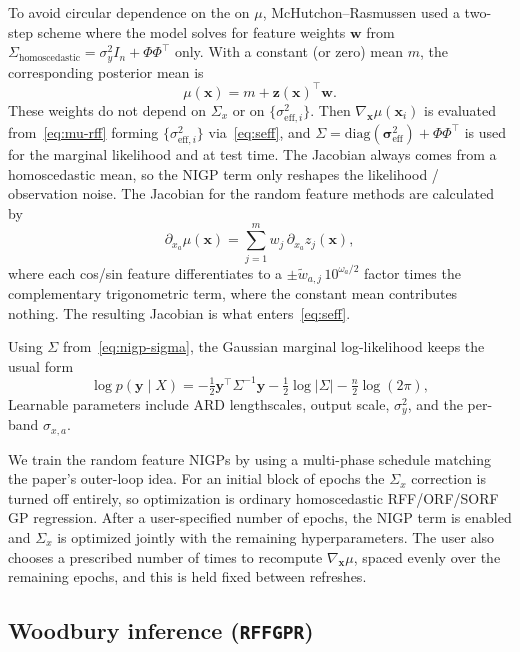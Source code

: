 \documentclass[11pt]{article}
\newcommand{\Sig}{\Sigma}
\newcommand{\Ph}{\Phi}
\newcommand{\gradmu}{\nabla_{\mathbf{x}}\mu}
\newcommand{\Sigx}{\Sigma_{x}}
\newcommand{\noisey}{\sigma_y^{2}}
\newcommand{\di}{\sigma_{\mathrm{eff},i}^{2}}
\newcommand{\seffvec}{\boldsymbol{\sigma}_{\mathrm{eff}}^{2}}
\begin{document}
To avoid circular dependence on the on $\mu$, McHutchon--Rasmussen used a two-step scheme where the model solves for feature weights $\mathbf{w}$ from $\Sig_{\mathrm{homoscedastic}}=\noisey I_n+\Ph\Ph^{\top}$ only. With a constant (or zero) mean $m$, the corresponding posterior mean is
\begin{equation}
    \label{eq:mu-rff}
      \mu(\mathbf{x})
      =
      m
      +
      \mathbf{z}(\mathbf{x})^{\top}\mathbf{w}.
    \end{equation}
These weights do not depend on $\Sigx$ or on $\{\di\}$. Then $\gradmu(\mathbf{x}_i)$ is evaluated from~\eqref{eq:mu-rff} forming $\{\di\}$ via~\eqref{eq:seff}, and $\Sig=\mathrm{diag}(\seffvec)+\Ph\Ph^{\top}$ is used for the marginal likelihood and at test time. The Jacobian
always comes from a homoscedastic mean, so the NIGP term only reshapes the likelihood /
observation noise. The Jacobian for the random feature methods are calculated by 
\begin{equation}
\label{eq:grad-mu-rff}
  \partial_{x_a}\mu(\mathbf{x})
  =
  \sum_{j=1}^{m}
  w_j\,
  \partial_{x_a} z_j(\mathbf{x}),
\end{equation}
where each cos/sin feature differentiates to a $\pm\tilde{w}_{a,j}\,10^{\omega_a/2}$
factor times the complementary trigonometric term, where the constant mean contributes
nothing. The resulting Jacobian is what enters~\eqref{eq:seff}.

Using $\Sig$ from~\eqref{eq:nigp-sigma}, the Gaussian marginal log-likelihood keeps the
usual form
\begin{equation}
\label{eq:nigp-mll}
  \log p(\mathbf{y}\mid X)
  =
  -\tfrac12\mathbf{y}^{\top}\Sig^{-1}\mathbf{y}
  -\tfrac12\log|\Sig|
  -\tfrac{n}{2}\log(2\pi),
\end{equation}
Learnable parameters include ARD lengthscales, output scale, $\noisey$, and the
per-band $\sigma_{x,a}$.

We train the random feature NIGPs by using a multi-phase schedule matching the paper's outer-loop idea. For an initial block of epochs the $\Sigx$ correction is turned off entirely, so optimization is ordinary homoscedastic RFF/ORF/SORF GP regression.
After a user-specified number of epochs, the NIGP term is enabled and $\Sigx$ is optimized jointly with the remaining hyperparameters.
The user also chooses a prescribed number of times to recompute $\gradmu$, spaced evenly over the remaining epochs, and this is held fixed between refreshes.

\subsection{Woodbury inference (\texttt{RFFGPR})}
\label{sec:woodbury}
\end{document}
